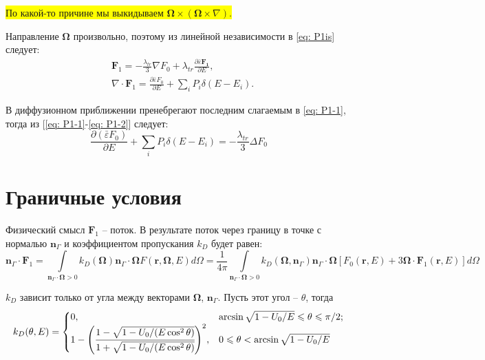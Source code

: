 \documentclass[a4paper,12pt]{article} %
\newcommand{\dff}[2]{\frac{\partial #1}{\partial #2}}
\renewcommand{\vec}[1]{\bm{#1}}
\newcommand{\eps}{\varepsilon}
\begin{document}
\colorbox{yellow}{По какой-то причине мы выкидываем $\vec{\Omega}\times(\vec{\Omega}\times\nabla)$.}

Направление $\vec{\Omega}$ произвольно, поэтому из линейной независимости в \eqref{eq: P1is} следует:
\begin{align}
    & \vec{F}_1 = -\frac{\lambda_{tr}}{3}\nabla F_0 + \lambda_{tr} \dff{\bar{\eps} \vec{F_1}}{E}, \label{eq: P1-1}\\
    & \nabla\cdot\vec{F}_1 = \dff{\bar{\eps}F_0}{E} + \sum_{i} P_i\delta(E - E_i). \label{eq: P1-2}
\end{align}

В диффузионном приближении пренебрегают последним слагаемым в \eqref{eq: P1-1}, тогда из [\ref{eq: P1-1}-\ref{eq: P1-2}] следует:
\begin{equation}
    \dff{(\bar{\eps}F_0)}{E} + \sum_{i} P_i\delta(E - E_i) = -\frac{\lambda_{tr}}{3}\Delta F_0
\end{equation}

\clearpage

\section{Граничные условия}

Физический смысл $\vec{F}_1$ -- поток. В результате поток через границу в точке с нормалью $\vec{n}_\Gamma$ и коэффициентом пропускания $k_D$ будет равен:
\begin{equation}
    \vec{n}_\Gamma \cdot \vec{F}_1 =
    \int\limits_{\vec{n}_\Gamma \cdot \vec{\Omega}>0} k_D(\vec{\Omega}) \vec{n}_\Gamma \cdot \vec{\Omega} F(\vec{r}, \vec{\Omega}, E) d\Omega = \frac{1}{4\pi} \int\limits_{\vec{n}_\Gamma \cdot \vec{\Omega}>0} k_D(\vec{\Omega}, \vec{n}_\Gamma) \vec{n}_\Gamma \cdot \vec{\Omega} [F_0(\vec{r}, E) + 3\vec{\Omega}\cdot\vec{F}_1(\vec{r}, E)]d\Omega
\end{equation}

$k_D$ зависит только от угла между векторами $\vec{\Omega}$, $\vec{n}_\Gamma$. Пусть этот угол -- $\theta$, тогда
\begin{equation}
    k_D(\theta, E) =
    \begin{cases}
        0,  & \arcsin\sqrt{1 - U_0/E} \leqslant \theta \leqslant \pi/2; \\
        1 - \Bigg(\cfrac{1 - \sqrt{1 - U_0/(E  \cos^2 \theta)}}{1 + \sqrt{1 - U_0/(E  \cos^2 \theta)}}\Bigg)^2, & 0 \leqslant \theta < \arcsin\sqrt{1 - U_0/E}
    \end{cases}
\end{equation}
\end{document}
